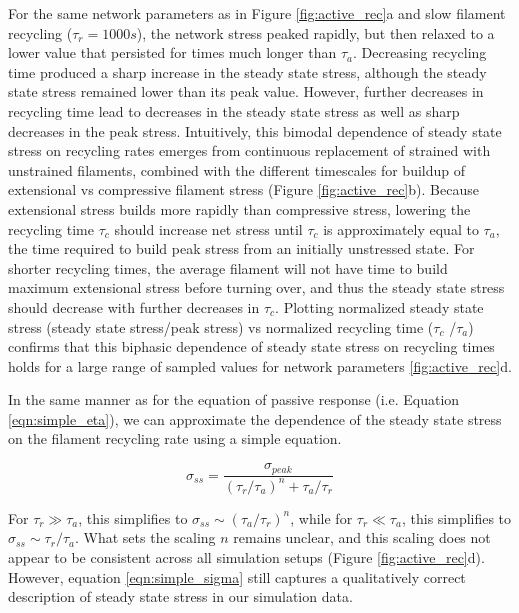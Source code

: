 \documentclass[10pt,letterpaper]{article}
\begin{document}
 For the same network parameters as in Figure \ref{fig:active_rec}a and slow filament recycling ($\tau_r = 1000 s$), the network stress peaked rapidly, but then relaxed to a lower value that persisted for times much longer than $\tau_a$. Decreasing recycling time produced a sharp increase in the steady state stress, although the steady state stress remained lower than its peak value.  However, further decreases in recycling time lead to decreases in the steady state stress as well as sharp decreases in the peak stress. Intuitively, this bimodal dependence of steady state stress on recycling rates emerges from continuous replacement of strained with unstrained filaments, combined with the different timescales for buildup of extensional vs compressive filament stress (Figure \ref{fig:active_rec}b). Because extensional stress builds more rapidly than compressive stress, lowering the recycling time $\tau_c$ should increase net stress until $\tau_c$ is approximately equal to $\tau_a$, the time required to build peak stress from an initially unstressed state. For shorter recycling times, the average filament will not have time to build maximum extensional stress before turning over, and thus the steady state stress should decrease with further decreases in $\tau_c$. Plotting normalized steady state stress (steady state stress/peak stress) vs normalized recycling time ($\tau_c$ /$\tau_a$) confirms that this biphasic dependence of steady state stress on recycling times holds for a large range of sampled values for network parameters \ref{fig:active_rec}d.


In the same manner as for the equation of passive response (i.e. Equation \ref{eqn:simple_eta}), we can approximate the dependence of the steady state stress on the filament recycling rate using a simple equation. 

\begin{equation}
\label{eqn:simple_sigma}
\sigma_{ss} = \frac{\sigma_{peak}}{(\tau_r/\tau_a)^n+\tau_a/\tau_r}  
\end{equation}

For $\tau_r\gg\tau_a$, this simplifies to $\sigma_{ss}\sim(\tau_a/\tau_r)^n$, while for $\tau_r\ll\tau_a$, this simplifies to $\sigma_{ss}\sim\tau_r/\tau_a$. What sets the scaling $n$ remains unclear, and this scaling does not appear to be consistent across all simulation setups (Figure \ref{fig:active_rec}d). However, equation \ref{eqn:simple_sigma} still captures a qualitatively correct description of steady state stress in our simulation data.
\end{document}

